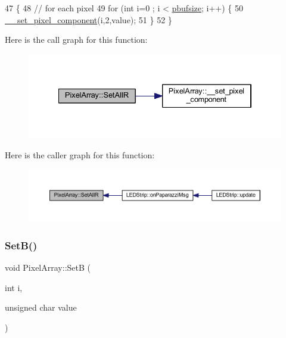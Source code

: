 \begin{DoxyCode}
47 \{
48     \textcolor{comment}{// for each pixel}
49     \textcolor{keywordflow}{for} (\textcolor{keywordtype}{int} i=0 ; i < \hyperlink{class_pixel_array_aca29e70f9b643bff3733ab2e694439a1}{pbufsize}; i++) \{
50         \hyperlink{class_pixel_array_a42c6681bf771332826ecc9ad2a8cea02}{\_\_set\_pixel\_component}(i,2,value);
51     \}
52 \}
\end{DoxyCode}
Here is the call graph for this function\+:\nopagebreak
\begin{figure}[H]
\begin{center}
\leavevmode
\includegraphics[width=334pt]{class_pixel_array_a9ddfdd1a01a9877e4bfcf5a462412fd2_cgraph}
\end{center}
\end{figure}
Here is the caller graph for this function\+:\nopagebreak
\begin{figure}[H]
\begin{center}
\leavevmode
\includegraphics[width=350pt]{class_pixel_array_a9ddfdd1a01a9877e4bfcf5a462412fd2_icgraph}
\end{center}
\end{figure}
\mbox{\label{class_pixel_array_a560a654c59614fd5a6c17adb10083a78}} 
\subsubsection{\texorpdfstring{Set\+B()}{SetB()}}
{\footnotesize\ttfamily void Pixel\+Array\+::\+SetB (\begin{DoxyParamCaption}\item[{int}]{i,  }\item[{unsigned char}]{value }\end{DoxyParamCaption})}




